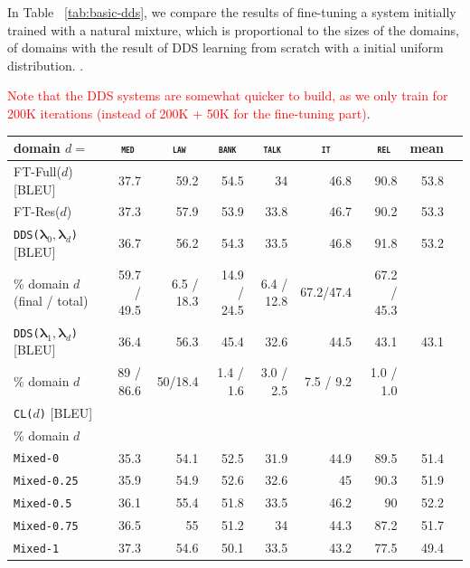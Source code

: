 \documentclass[11pt,a4paper]{article}
\newcommand{\fyTodo}[1]{\Todo[FY:]{\textcolor{orange}{#1}}}
\newcommand{\revision}[1]{\textcolor{red}{#1}}
\newcommand{\domain}[1]{\texttt{\textsc{#1}}}
\newcommand{\system}[1]{\texttt{{#1}}}
\newcommand{\vlambda}{\ensuremath{\boldsymbol\lambda}\xspace} %
\begin{document}
\fyTodo{Fix the table}
In Table ~\ref{tab:basic-dds}, we compare the results of fine-tuning a system initially trained with a natural mixture, which is proportional to the sizes of the domains, of domains with the result of DDS learning from scratch with a initial uniform distribution. \fyTodo{What do we see ? How about domain proximity ? - show a graph}. 


\fyTodo{Only if we compare on an individual domain} \revision{Note that the DDS systems are somewhat quicker to build, as we only train for 200K iterations (instead of 200K + 50K for the fine-tuning part)}. 

\begin{table}
  \centering \small
  \begin{tabular}{|l|*8{r|}} \hline
    domain \hfill $d=$ & \multicolumn{1}{c|}{\domain{ med}} & \multicolumn{1}{c|}{\domain{ law}} & \multicolumn{1}{c|}{\domain{bank}} & \multicolumn{1}{c|}{\domain{talk}} & \multicolumn{1}{c|}{\domain{ it }} & \multicolumn{1}{c|}{\domain{ rel}} & \multicolumn{1}{c|}{mean} \\ \hline
    FT-Full($d$) \hfill [BLEU] &37.7&59.2&54.5&34&46.8&90.8&53.8\\
    FT-Res($d$) \hfill &37.3&57.9&53.9&33.8&46.7&90.2&53.3\\ \hline
    \hline
    \system{DDS($\vlambda_0, \vlambda_d$)} \hfill [BLEU] &36.7&56.2&54.3&33.5&46.8&91.8&53.2\\
    \% domain $d$ (final / total) & 59.7 / 49.5 & 6.5 / 18.3 & 14.9 / 24.5 & 6.4 / 12.8 & 67.2/47.4 & 67.2 / 45.3&\\ \hline
    \system{DDS($\vlambda_1, \vlambda_d$)} \hfill [BLEU]&36.4&56.3& 45.4& 32.6&44.5&43.1&43.1\\
    \% domain $d$& 89 / 86.6 & 50/18.4 & 1.4 / 1.6 & 3.0 / 2.5 & 7.5 / 9.2 & 1.0 / 1.0 \\ \hline
    \system{CL($d$)} \hfill [BLEU]&  \\ 
    \% domain $d$& \\ \hline\hline
    \system{Mixed-0}      & 35.3 & 54.1 & 52.5 & 31.9 & 44.9 & 89.5& 51.4 \\
    \system{Mixed-0.25} & 35.9 & 54.9 & 52.6 & 32.6 & 45 & 90.3& 51.9 \\
    \system{Mixed-0.5}   & 36.1 & 55.4 & 51.8 & 33.5 & 46.2 & 90 & 52.2 \\
    \system{Mixed-0.75} & 36.5 & 55 & 51.2 & 34 & 44.3 & 87.2& 51.7 \\
    \system{Mixed-1}     & 37.3  & 54.6 & 50.1 & 33.5 & 43.2 & 77.5& 49.4 \\

\end{tabular}
\end{table}
\end{document}
